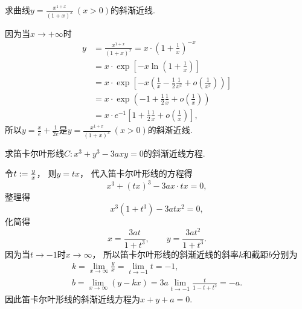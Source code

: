 \begin{example}
求曲线\(y = \frac{x^{1+x}}{(1+x)^x}\ (x>0)\)的斜渐近线.
\begin{solution}
因为当\(x\to+\infty\)时\begin{align*}
	y &= \frac{x^{1+x}}{(1+x)^x}
	= x \cdot \left( 1 + \frac1x \right)^{-x} \\
	&= x \cdot \exp[-x \ln(1 + \frac1x)] \\
	&= x \cdot \exp[-x \left( \frac1x - \frac12 \frac1{x^2} + o\left(\frac1{x^2}\right) \right)] \\
	&= x \cdot \exp\left( -1 + \frac12 \frac1x + o\left(\frac1x\right) \right) \\
	&= x \cdot e^{-1} \left[ 1 + \frac12 \frac1x + o\left(\frac1x\right) \right],
\end{align*}
所以\(y = \frac{x}{e} + \frac1{2e}\)是\(y = \frac{x^{1+x}}{(1+x)^x}\ (x>0)\)的斜渐近线.
\end{solution}
\end{example}

\begin{example}
求笛卡尔叶形线\(C: x^3+y^3-3axy=0\)的斜渐近线方程.
\begin{solution}
令\(t := \frac{y}{x}\)，
则\(y = tx\)，
代入笛卡尔叶形线的方程得\begin{equation*}
	x^3+(tx)^3-3ax \cdot tx = 0,
\end{equation*}
整理得\begin{equation*}
	x^3(1+t^3)-3atx^2=0,
\end{equation*}
化简得\begin{equation*}
	x = \frac{3at}{1+t^3},
	\qquad
	y = \frac{3at^2}{1+t^3}.
\end{equation*}
因为当\(t\to-1\)时\(x\to\infty\)，
所以笛卡尔叶形线的斜渐近线的斜率\(k\)和截距\(b\)分别为\begin{gather*}
	k = \lim_{x\to\infty} \frac{y}{x}
	= \lim_{t\to-1} t
	= -1, \\
	b = \lim_{x\to\infty} (y-kx)
	= 3a \lim_{t\to-1} \frac{t}{1-t+t^2}
	= -a.
\end{gather*}
因此笛卡尔叶形线的斜渐近线方程为\(x+y+a=0\).
\end{solution}
\end{example}

